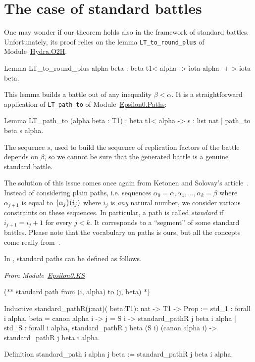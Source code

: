 \documentclass[a4paper]{book}
\begin{document}
\section{The case of standard battles}
\label{sec:standard-intro}\label{std-case}
One may wonder if our theorem holds also in the framework of standard battles. Unfortunately, its proof relies on the lemma \texttt{LT\_to\_round\_plus} of
Module~\href{../src/html/hydras.Hydra.O2H.html}{Hydra.O2H}.

\begin{Coqsrc}
Lemma LT_to_round_plus alpha beta :
    beta t1< alpha ->  iota alpha -+-> iota beta.
\end{Coqsrc}

This lemma builds a battle out of any inequality $\beta<\alpha$. 
It is a straightforward application of \texttt{LT\_path\_to} of
Module~\href{../src/html/hydras.Epsilon0.Paths.html}{Epsilon0.Paths}:

\begin{Coqsrc}
Lemma LT_path_to (alpha beta : T1) :
  beta t1< alpha -> {s : list nat | path_to beta s alpha}.
\end{Coqsrc}

The sequence $s$, used to build the sequence of replication factors of the battle depends on 
$\beta$, so we cannot be sure that the generated battle is a genuine standard battle.


The solution of this issue comes  once again from Ketonen and Solovay's article~\cite{KS81}. Instead of considering plain paths, i.e. sequences 
$\alpha_0=\alpha,\alpha_1,\dots,\alpha_k=\beta$ where $\alpha_{j+1}$ is equal
to $\mbox{$\{\alpha_j\}(i_j)$}$ where $i_j$ is \emph{any} natural number, 
we consider various constraints on these sequences.
In particular, a path is called \emph{standard} if $i_{j+1} = i_j + 1$ for every $j<k$.
It  corresponds to a ``segment'' of some standard battles. 
Please note that the vocabulary on paths is ours, but all the concepts come really from~\cite{KS81}.

In \coq{}, standard paths can be defined as follows.

\vspace{4pt}
\emph{From Module~\href{../src/html/hydras.Epsilon0.KS.html}{Epsilon0.KS}}

\begin{Coqsrc}
(**  standard path from (i, alpha) to (j, beta) *)

Inductive standard_pathR(j:nat)( beta:T1):  nat -> T1 -> Prop :=
  std_1 : forall i alpha, 
       beta = canon alpha i -> j = S i ->
       standard_pathR j beta i  alpha
| std_S : forall i alpha, 
      standard_pathR j beta (S i) (canon alpha i)  ->
      standard_pathR j beta i alpha.

Definition standard_path  i alpha j beta := 
   standard_pathR j beta i alpha.
\end{Coqsrc}
\end{document}
